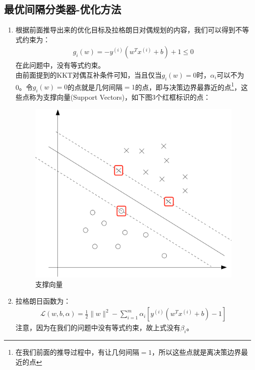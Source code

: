 \subsection{最优间隔分类器-优化方法}
\begin{enumerate}
	\item 根据前面推导出来的优化目标及拉格朗日对偶规划的内容，我们可以得到不等式约束为：
	\begin{align}
		g_i(w) = -y^{(i)}\left(w^Tx^{(i)}+b\right)+1 \leq 0
	\end{align}
	在此问题中，没有等式约束。\\
	由前面提到的KKT对偶互补条件可知，当且仅当$g_i(w)=0$时，$\alpha_i$可以不为0。令$g_i(w)=0$的点就是几何间隔$=1$的点，即与决策边界最靠近的点\footnote{在我们前面的推导过程中，有让几何间隔$=1$，所以这些点就是离决策边界最近的点}，这些点称为支撑向量(Support Vectors)，如下图3个红框标识的点：
	\begin{figure}[htbp]
		\centering
		\includegraphics[scale=0.35]{images/支撑向量}
		\caption{支撑向量}
	\end{figure}

	\item 拉格朗日函数为：
	\begin{align}
		\mathcal{L}(w, b, \alpha) = \frac{1}{2}\|w\|^2 - \sum_{i=1}^{m}\alpha_i \left[y^{(i)}(w^Tx^{(i)}+b)-1\right]
	\end{align}
	注意，因为在我们的问题中没有等式约束，故上式没有$\beta_i$。


\end{enumerate}
